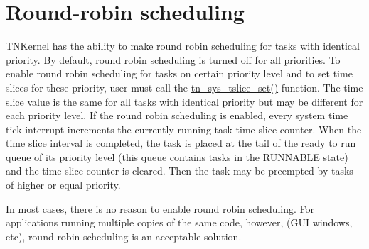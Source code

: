 \hypertarget{quick_guide_round_robin}{}\section{Round-\/robin scheduling}\label{quick_guide_round_robin}
T\+N\+Kernel has the ability to make round robin scheduling for tasks with identical priority. By default, round robin scheduling is turned off for all priorities. To enable round robin scheduling for tasks on certain priority level and to set time slices for these priority, user must call the {\ttfamily \hyperlink{tn__sys_8h_a05fc370b6faa604fd8ff9411361c4cd0}{tn\+\_\+sys\+\_\+tslice\+\_\+set()}} function. The time slice value is the same for all tasks with identical priority but may be different for each priority level. If the round robin scheduling is enabled, every system time tick interrupt increments the currently running task time slice counter. When the time slice interval is completed, the task is placed at the tail of the ready to run queue of its priority level (this queue contains tasks in the \hyperlink{tn__tasks_8h_a5e12e8a0ab280b515f44bf3fee1210a6a02783ac7808aeda318a6f506b7a276dc}{{\ttfamily R\+U\+N\+N\+A\+B\+L\+E}} state) and the time slice counter is cleared. Then the task may be preempted by tasks of higher or equal priority.

In most cases, there is no reason to enable round robin scheduling. For applications running multiple copies of the same code, however, (G\+U\+I windows, etc), round robin scheduling is an acceptable solution. 